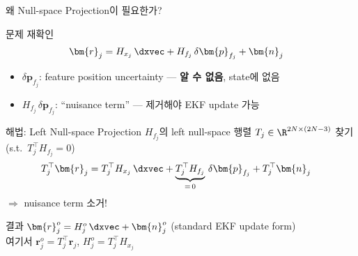 \begin{frame}[shrink=20]{왜 Null-space Projection이 필요한가?}
  \begin{block}{문제 재확인}
    \begin{align*}
      \bm{r}_j &= H_{x_j}\,\dxvec + H_{f_j}\,\delta\bm{p}_{f_j} + \bm{n}_j
    \end{align*}
    \begin{itemize}
      \item $\delta\bm{p}_{f_j}$: feature position uncertainty — \textbf{알 수 없음}, state에 없음
      \item $H_{f_j}\,\delta\bm{p}_{f_j}$: ``nuisance term'' — 제거해야 EKF update 가능
    \end{itemize}
  \end{block}
  \begin{block}{해법: Left Null-space Projection}
    $H_{f_j}$의 left null-space 행렬 $T_j \in \R^{2N\times(2N-3)}$ 찾기 (s.t.\ $T_j^\top H_{f_j} = 0$)
    \begin{align*}
      T_j^\top \bm{r}_j &= T_j^\top H_{x_j}\,\dxvec + \underbrace{T_j^\top H_{f_j}}_{=\,0}\,\delta\bm{p}_{f_j} + T_j^\top\bm{n}_j
    \end{align*}
    $\Rightarrow$ nuisance term 소거!
  \end{block}
  \begin{exampleblock}{결과}
    $\bm{r}_j^o = H_j^o\,\dxvec + \bm{n}_j^o$ \quad (standard EKF update form)\\
    여기서 $\bm{r}_j^o = T_j^\top\bm{r}_j$, $H_j^o = T_j^\top H_{x_j}$
  \end{exampleblock}
\end{frame}

